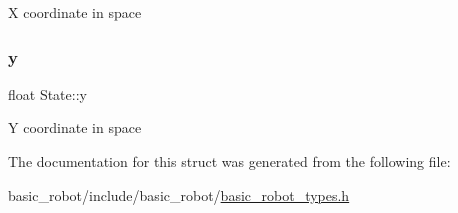 X coordinate in space \mbox{\label{structState_a89572abb38dea3b1a780ede589a2d59b}} 
\subsubsection{\texorpdfstring{y}{y}}
{\footnotesize\ttfamily float State\+::y}

Y coordinate in space 

The documentation for this struct was generated from the following file\+:\begin{DoxyCompactItemize}
\item 
basic\+\_\+robot/include/basic\+\_\+robot/\hyperlink{basic__robot__types_8h}{basic\+\_\+robot\+\_\+types.\+h}\end{DoxyCompactItemize}
